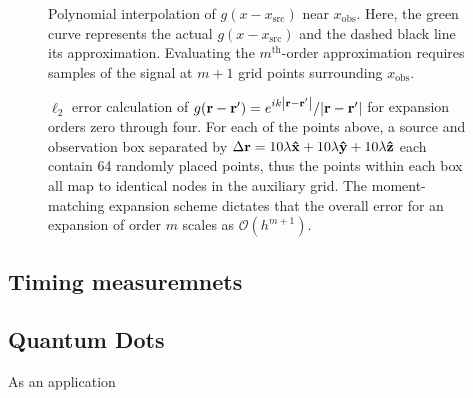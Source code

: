 \begin{figure}
  \centering
  
  \caption{\label{fig:1d moments} Polynomial interpolation of $g(x - x_\text{src})$ near $x_\text{obs}$.
    Here, the green curve represents the actual $g(x - x_\text{src})$ and the dashed black line its approximation.
    Evaluating the $m^\text{th}$-order approximation requires samples of the signal at $m + 1$ grid points surrounding $x_\text{obs}$.
  }
\end{figure}

\begin{figure}
  \centering
  
  \caption{\label{fig:grid convergence} $\ell_2$ error calculation of $g(\vb{r} - \vb{r}') = e^{i k \abs{\vb{r} - \vb{r}'}}/{\abs{\vb{r} - \vb{r}'}}$ for expansion orders zero through four.
    For each of the points above, a source and observation box separated by $\Delta \vb{r} = 10\lambda \vu{x} + 10 \lambda \vu{y} + 10 \lambda \vu{z}$ each contain 64 randomly placed points, thus the points within each box all map to identical nodes in the auxiliary grid.
    The moment-matching expansion scheme dictates that the overall error for an expansion of order $m$ scales as $\mathcal{O}(h^{m + 1})$.
  }
\end{figure}

\subsection{Timing measuremnets}



\subsection{Quantum Dots}

As an application 
